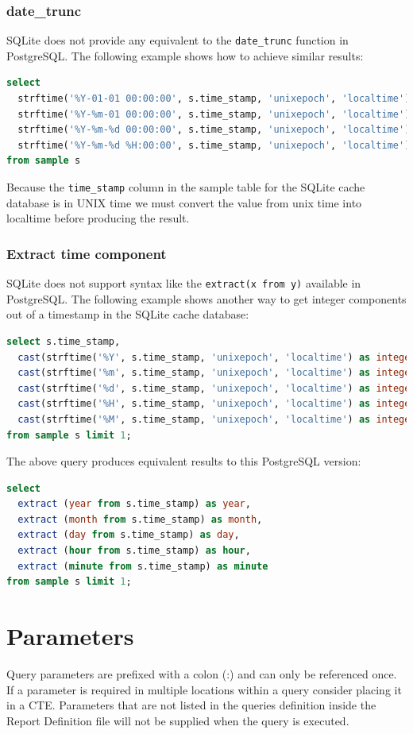 \documentclass[a4paper,10pt]{book}
\begin{document}
\subsubsection{date\_trunc}
SQLite does not provide any equivalent to the \verb|date_trunc| function in PostgreSQL. The following example shows how to achieve similar results:
\begin{lstlisting}[language=SQL]
select
  strftime('%Y-01-01 00:00:00', s.time_stamp, 'unixepoch', 'localtime') as trunc_year,
  strftime('%Y-%m-01 00:00:00', s.time_stamp, 'unixepoch', 'localtime') as trunc_month,
  strftime('%Y-%m-%d 00:00:00', s.time_stamp, 'unixepoch', 'localtime') as trunc_day,
  strftime('%Y-%m-%d %H:00:00', s.time_stamp, 'unixepoch', 'localtime') as trunc_hour
from sample s
\end{lstlisting}
Because the \verb|time_stamp| column in the sample table for the SQLite cache database is in UNIX time we must convert the value from unix time into localtime before producing the result.

\subsubsection{Extract time component}
SQLite does not support syntax like the \verb|extract(x from y)| available in PostgreSQL. The following example shows another way to get integer components out of a timestamp in the SQLite cache database:
\begin{lstlisting}[language=SQL]
select s.time_stamp,
  cast(strftime('%Y', s.time_stamp, 'unixepoch', 'localtime') as integer) as year,
  cast(strftime('%m', s.time_stamp, 'unixepoch', 'localtime') as integer) as month,
  cast(strftime('%d', s.time_stamp, 'unixepoch', 'localtime') as integer) as day,
  cast(strftime('%H', s.time_stamp, 'unixepoch', 'localtime') as integer) as hour,
  cast(strftime('%M', s.time_stamp, 'unixepoch', 'localtime') as integer) as minute
from sample s limit 1;
\end{lstlisting}

The above query produces equivalent results to this PostgreSQL version:
\begin{lstlisting}[language=SQL]
select
  extract (year from s.time_stamp) as year,
  extract (month from s.time_stamp) as month,
  extract (day from s.time_stamp) as day,
  extract (hour from s.time_stamp) as hour,
  extract (minute from s.time_stamp) as minute
from sample s limit 1;
\end{lstlisting}


\section{Parameters}
Query parameters are prefixed with a colon (:) and can only be referenced once. If a parameter is required in multiple locations within a query consider placing it in a CTE.
Parameters that are not listed in the queries definition inside the Report Definition file will not be supplied when the query is executed.
\end{document}
